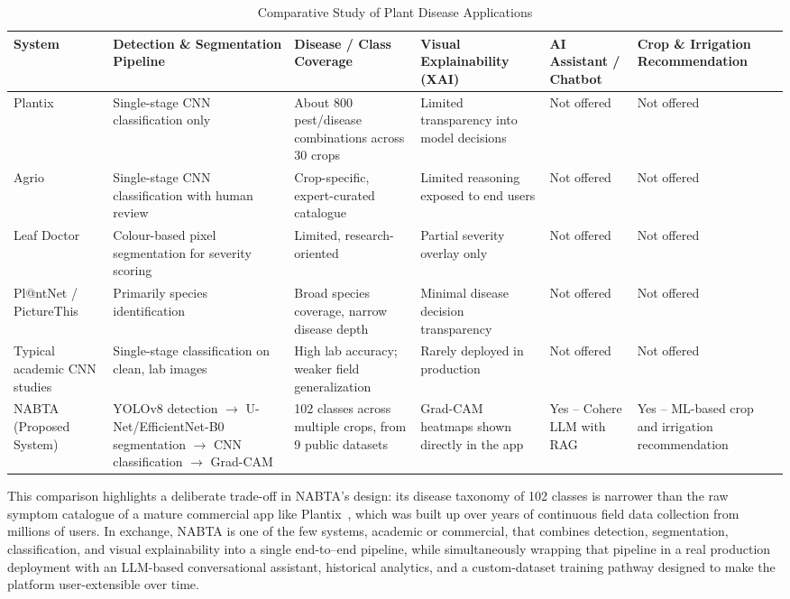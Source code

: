 \begin{table}[H]
\centering
\tiny
\setlength{\tabcolsep}{2.2pt}
\renewcommand{\arraystretch}{1.2}
\caption{Comparative Study of Plant Disease Applications}
\label{tab:intro_related_work}
\begin{tabularx}{\textwidth}{|L{1.9cm}|L{2.75cm}|L{2.45cm}|L{2.35cm}|L{1.95cm}|Y|}
\hline
\textbf{System} & \textbf{Detection \& Segmentation Pipeline} & \textbf{Disease / Class Coverage} & \textbf{Visual Explainability (XAI)} & \textbf{AI Assistant / Chatbot} & \textbf{Crop \& Irrigation Recommendation} \\
\hline
Plantix~\cite{plantix_website} & Single-stage CNN classification only & About 800 pest/disease combinations across 30 crops & Limited transparency into model decisions & Not offered & Not offered \\
\hline
Agrio~\cite{agrio_website} & Single-stage CNN classification with human review & Crop-specific, expert-curated catalogue & Limited reasoning exposed to end users & Not offered & Not offered \\
\hline
Leaf Doctor~\cite{pethybridge2015leaf} & Colour-based pixel segmentation for severity scoring & Limited, research-oriented & Partial severity overlay only & Not offered & Not offered \\
\hline
Pl@ntNet / PictureThis~\cite{plantnet_website} & Primarily species identification & Broad species coverage, narrow disease depth & Minimal disease decision transparency & Not offered & Not offered \\
\hline
Typical academic CNN studies & Single-stage classification on clean, lab images & High lab accuracy; weaker field generalization & Rarely deployed in production & Not offered & Not offered \\
\hline
NABTA (Proposed System) & YOLOv8 detection $\rightarrow$ U-Net/EfficientNet-B0 segmentation $\rightarrow$ CNN classification $\rightarrow$ Grad-CAM & 102 classes across multiple crops, from 9 public datasets & Grad-CAM heatmaps shown directly in the app & Yes -- Cohere LLM with RAG & Yes -- ML-based crop and irrigation recommendation \\
\hline
\end{tabularx}
\end{table}

This comparison highlights a deliberate trade-off in NABTA's design: its disease taxonomy of 102 classes is narrower than the raw symptom catalogue of a mature commercial app like Plantix~\cite{plantix_website}, which was built up over years of continuous field data collection from millions of users. In exchange, NABTA is one of the few systems, academic or commercial, that combines detection, segmentation, classification, and visual explainability into a single end-to--end pipeline, while simultaneously wrapping that pipeline in a real production deployment with an LLM-based conversational assistant, historical analytics, and a custom-dataset training pathway designed to make the platform user-extensible over time.

